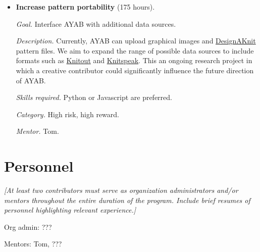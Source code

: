 \documentclass{article}
\begin{document}
\begin{itemize}
\textit{Goal.} Change the internal representation and graphical output of the AYAB software to allow different stitch types. 

\textit{Description.} AYAB currently implements various different methods for colorwork knitting, but does not allow variations in texture. Allowing different kinds of stitch -- first and foremost Purl stitches, but possibly also increases, decreases, and cables -- would increase the range of designs that can be created and enable AYAB users to make better use of the capabilities of their knitting machines.

\textit{Skills required.} Python or Javascript are preferred.

\textit{Category.} High risk, high reward.

\textit{Mentor.} Tom.


\item \textbf{Increase pattern portability} (175 hours). 

\textit{Goal.} Interface AYAB with additional data sources.

\textit{Description.} Currently, AYAB can upload graphical images and \href{https://www.softbyte.co.uk/designaknit9.htm}{DesignAKnit} pattern files. We aim to expand the range of possible data sources to include formats such as \href{https://textiles-lab.github.io/knitout/knitout.html}{Knitout} and \href{https://stitch-maps.com/about/knitspeak/}{Knitspeak}. This an ongoing research project in which a creative contributor could significantly influence the future direction of AYAB.

\textit{Skills required.} Python or Javascript are preferred.

\textit{Category.} High risk, high reward.

\textit{Mentor.} Tom.
\end{itemize}


\section{Personnel}

{\itshape 
[At least two contributors must serve as organization administrators and/or mentors throughout the entire duration of the program. Include brief resumes of personnel highlighting relevant experience.]
}
\newline

\begin{flushleft}
Org admin: ???
\newline

Mentors: Tom, ???
\end{flushleft}
\end{document}
